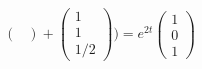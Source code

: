 \documentclass{article}
\begin{document}
\begin{align*}
\begin{pmatrix}
                                                                                                                                     \end{pmatrix}+\begin{pmatrix}
                                                                                                                                                       1 \\
                                                                                                                                                       1 \\
                                                                                                                                                       1/2
                                                                                                                                                   \end{pmatrix}) =e^{2t}\begin{pmatrix}
                                                                                                                                                                             1 \\
                                                                                                                                                                             0 \\
                                                                                                                                                                             1
                                                                                                                                                                         \end{pmatrix} \\
\end{align*}
\end{document}
